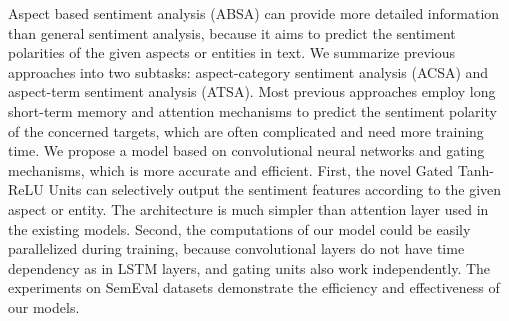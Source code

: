 Aspect based sentiment analysis (ABSA) can provide more detailed information than general sentiment analysis, because it aims to predict the sentiment polarities of the given aspects or entities in text. We summarize previous approaches into two subtasks: aspect-category sentiment analysis (ACSA) and aspect-term sentiment analysis (ATSA). Most previous approaches employ long short-term memory and attention mechanisms to predict the sentiment polarity of the concerned targets, which are often complicated and need more training time. We propose a model based on convolutional neural networks and gating mechanisms, which is more accurate and efficient. First, the novel Gated Tanh-ReLU Units can selectively output the sentiment features according to the given aspect or entity. The architecture is much simpler than attention layer used in the existing models. Second, the computations of our model could be easily parallelized during training, because convolutional layers do not have time dependency as in LSTM layers, and gating units also work independently. The experiments on SemEval datasets demonstrate the efficiency and effectiveness of our models.
